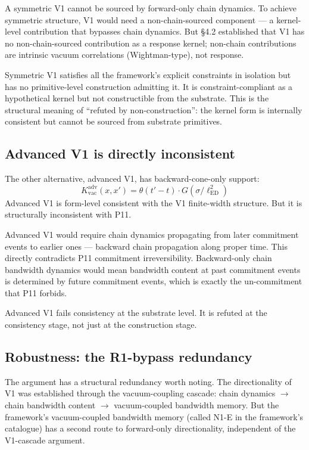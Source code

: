 \documentclass[11pt,a4paper]{article}
\begin{document}
A symmetric V1 cannot be sourced by forward-only chain dynamics. To achieve symmetric structure, V1 would need a non-chain-sourced component --- a kernel-level contribution that bypasses chain dynamics. But \S4.2 established that V1 has no non-chain-sourced contribution as a response kernel; non-chain contributions are intrinsic vacuum correlations (Wightman-type), not response.

Symmetric V1 satisfies all the framework's explicit constraints in isolation but has no primitive-level construction admitting it. It is constraint-compliant as a hypothetical kernel but not constructible from the substrate. This is the structural meaning of ``refuted by non-construction'': the kernel form is internally consistent but cannot be sourced from substrate primitives.

\subsection{Advanced V1 is directly inconsistent}

The other alternative, advanced V1, has backward-cone-only support:
\[
K_{\mathrm{vac}}^{\mathrm{adv}}(x, x') = \theta(t' - t) \cdot G(\sigma / \ell_{\mathrm{ED}}^{2})
\]
Advanced V1 is form-level consistent with the V1 finite-width structure. But it is structurally inconsistent with P11.

Advanced V1 would require chain dynamics propagating from later commitment events to earlier ones --- backward chain propagation along proper time. This directly contradicts P11 commitment irreversibility. Backward-only chain bandwidth dynamics would mean bandwidth content at past commitment events is determined by future commitment events, which is exactly the un-commitment that P11 forbids.

Advanced V1 fails consistency at the substrate level. It is refuted at the consistency stage, not just at the construction stage.

\subsection{Robustness: the R1-bypass redundancy}

The argument has a structural redundancy worth noting. The directionality of V1 was established through the vacuum-coupling cascade: chain dynamics $\to$ chain bandwidth content $\to$ vacuum-coupled bandwidth memory. But the framework's vacuum-coupled bandwidth memory (called N1-E in the framework's catalogue) has a second route to forward-only directionality, independent of the V1-cascade argument.
\end{document}
